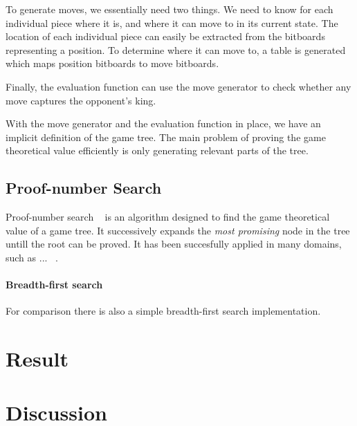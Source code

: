 \documentclass{article}
\begin{document}
To generate moves, we essentially need two things. We need to know for each individual piece where it is, and where it can move to in its current state.
The location of each individual piece can easily be extracted from the bitboards representing a position. To determine where it can move to, a table
is generated which maps position bitboards to move bitboards. %

Finally, the evaluation function   can use the move
generator to check whether any move captures the opponent's king.

With the move generator and the evaluation function in place, we have an implicit definition of the game tree. The main problem of proving the game
theoretical value efficiently is only generating relevant parts of the tree.

\subsection{Proof-number Search}
Proof-number search ~\cite{allis1994proof} is an algorithm designed to find the game theoretical value of a game tree. It successively expands the
\textit{most promising} node in the tree untill the root can be proved. It has been succesfully applied in many domains, such as ... ~\cite{seo2001pn}.


\paragraph{Breadth-first search}
For comparison there is also a simple breadth-first search implementation.

\section{Result}


\section{Discussion}
\end{document}
